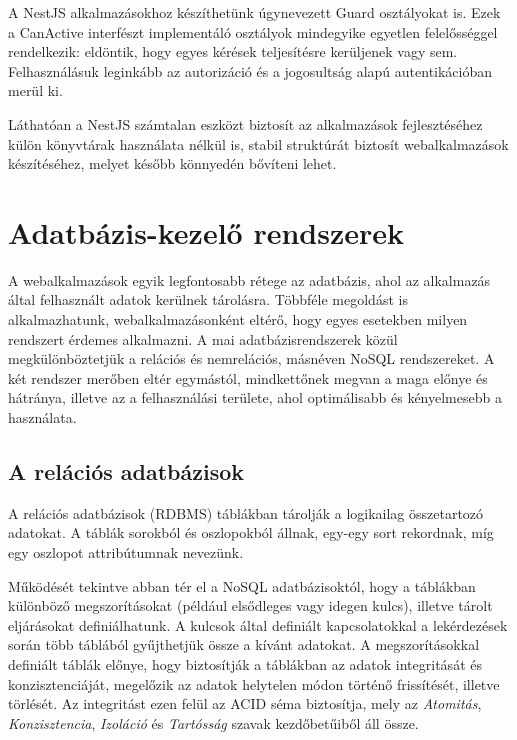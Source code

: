\documentclass[
]{thesis-ekf}
\theoremstyle{definition}
\theoremstyle{remark}
\begin{document}
	
	
	A NestJS alkalmazásokhoz készíthetünk úgynevezett Guard osztályokat is. Ezek a CanActive interfészt implementáló osztályok mindegyike egyetlen felelősséggel rendelkezik: eldöntik, hogy egyes kérések teljesítésre kerüljenek vagy sem. Felhasználásuk leginkább az autorizáció és a jogosultság alapú autentikációban merül ki.
	
	Láthatóan a NestJS számtalan eszközt biztosít az alkalmazások fejlesztéséhez külön könyvtárak használata nélkül is, stabil struktúrát biztosít webalkalmazások készítéséhez, melyet később könnyedén bővíteni lehet.
	
	\section{Adatbázis-kezelő rendszerek}
	A webalkalmazások egyik legfontosabb rétege az adatbázis, ahol az alkalmazás által felhasznált adatok kerülnek tárolásra. Többféle megoldást is alkalmazhatunk, webalkalmazásonként eltérő, hogy egyes esetekben milyen rendszert érdemes alkalmazni. A mai adatbázisrendszerek közül megkülönböztetjük a relációs és nemrelációs, másnéven NoSQL rendszereket. A két rendszer merőben eltér egymástól, mindkettőnek megvan a maga előnye és hátránya, illetve az a felhasználási területe, ahol optimálisabb és kényelmesebb a használata.
	
	\subsection[A relációs adatbázisok]{A relációs adatbázisok\cite{relationalvsnon-relational}\cite{ibm_sqlvsnosql}}
	A relációs adatbázisok (RDBMS) táblákban tárolják a logikailag összetartozó adatokat. A táblák sorokból és oszlopokból állnak, egy-egy sort rekordnak, míg egy oszlopot attribútumnak nevezünk.
	
	Működését tekintve abban tér el a NoSQL adatbázisoktól, hogy a táblákban különböző megszorításokat (például elsődleges vagy idegen kulcs), illetve tárolt eljárásokat definiálhatunk. A kulcsok által definiált kapcsolatokkal a lekérdezések során több táblából gyűjthetjük össze a kívánt adatokat. A megszorításokkal definiált táblák előnye, hogy biztosítják a táblákban az adatok integritását és konzisztenciáját, megelőzik az adatok helytelen módon történő frissítését, illetve törlését. Az integritást ezen felül az ACID séma biztosítja, mely az \emph{Atomitás}, \emph{Konzisztencia}, \emph{Izoláció} és \emph{Tartósság} szavak kezdőbetűiből áll össze.
	
\end{document}
